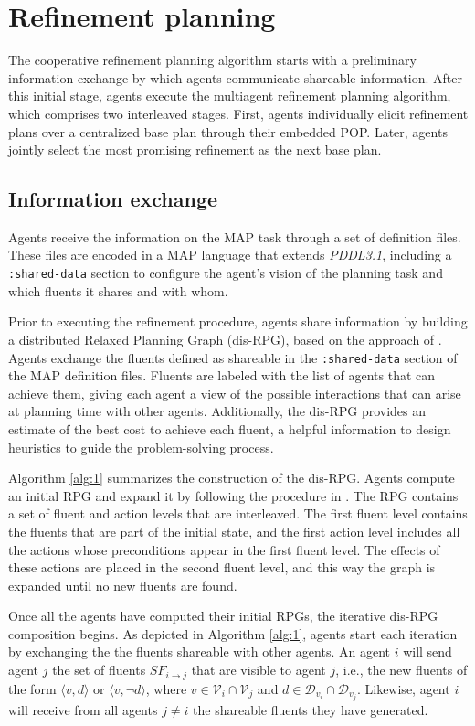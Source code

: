 \documentclass[12pt]{article}
\begin{document}
\section{Refinement planning}

The cooperative refinement planning algorithm starts with a preliminary information exchange by which agents communicate shareable information. After this initial stage, agents execute the multiagent refinement planning algorithm, which comprises two interleaved stages. First, agents individually elicit refinement plans over a centralized base plan through their embedded POP. Later, agents jointly select the most promising refinement as the next base plan.

\subsection{Information exchange}

Agents receive the information on the MAP task through a set of definition files. These files are encoded in a MAP language that extends \textit{PDDL3.1}, including a \texttt{:shared-data} section to configure the agent’s vision of the planning task and which fluents it shares and with whom.

Prior to executing the refinement procedure, agents share information by building a distributed Relaxed Planning Graph (dis-RPG), based on the approach of \cite{Zhang2007GraphbasedMR}. Agents exchange the fluents defined as shareable in the \texttt{:shared-data} section of the MAP definition files. Fluents are labeled with the list of agents that can achieve them, giving each agent a view of the possible interactions that can arise at planning time with other agents. Additionally, the dis-RPG provides an estimate of the best cost to achieve each fluent, a helpful information to design heuristics to guide the problem-solving process.

Algorithm \ref{alg:1} summarizes the construction of the dis-RPG. Agents compute an initial RPG and expand it by following the procedure in \cite{Hoffmann2011TheFP}. The RPG contains a set of fluent and action levels that are interleaved. The first fluent level contains the fluents that are part of the initial state, and the first action level includes all the actions whose preconditions appear in the first fluent level. The effects of these actions are placed in the second fluent level, and this way the graph is expanded until no new fluents are found.

Once all the agents have computed their initial RPGs, the iterative dis-RPG composition begins. As depicted in Algorithm \ref{alg:1}, agents start each iteration by exchanging the the fluents shareable with other agents. An agent $i$ will send agent $j$ the set of fluents $SF_{i\rightarrow j}$ that are visible to agent $j$, i.e., the new fluents of the form $\langle v,d\rangle$ or $\langle v,\neg d\rangle$, where $v \in \mathcal{V}_i \cap \mathcal{V}_j$ and $d \in \mathcal{D}_{v_i} \cap \mathcal{D}_{v_j}$. Likewise, agent $i$ will receive from all agents $j \neq i$ the shareable fluents they have generated.
\end{document}
